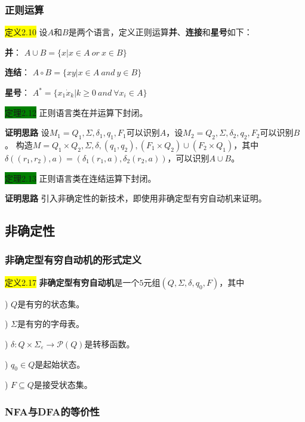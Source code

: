 \documentclass[a4paper]{article}
\begin{document}
\subsubsection{正则运算}

	\colorbox{yellow}{定义2.10} 设$A$和$B$是两个语言，定义正则运算\textbf{并}、\textbf{连接}和\textbf{星号}如下：
	
	\qquad \textbf{并}： $A \cup B = \{x|x \in A~or~x \in B\}$
	
	\qquad \textbf{连结}： $A \circ B = \{xy|x \in A~and~y \in B\}$
	
	\qquad \textbf{星号}： $A^* = \{x_1 \dot x_k|k \geq 0~and~\forall x_i \in A\}$

	\colorbox{green}{定理2.12} 正则语言类在并运算下封闭。
	
	\textbf{证明思路} 
	\qquad 设$M_1={Q_1,\Sigma,\delta_1,q_1,F_1}$可以识别$A$，设$M_2={Q_2,\Sigma,\delta_2,q_2,F_2}$可以识别$B$。
	\qquad 构造$M={Q_1 \times Q_2,\Sigma,\delta,(q_1, q_2),(F_1 \times Q_2) \cup (F_2 \times Q_1)}$，其中$\delta((r_1,r_2), a)=(\delta_1(r_1,a), \delta_2(r_2, a))$，可以识别$A \cup B$。
	
	\colorbox{green}{定理2.13} 正则语言类在连结运算下封闭。
	
	\textbf{证明思路} \quad 引入非确定性的新技术，即使用非确定型有穷自动机来证明。

\subsection{非确定性}

\subsubsection{非确定型有穷自动机的形式定义}

	\colorbox{yellow}{定义2.17} \textbf{非确定型有穷自动机}是一个$5$元组$(Q, \Sigma, \delta, q_0, F)$，其中
	
	) $Q$是有穷的状态集。
	
	) $\Sigma$是有穷的字母表。

	) $\delta:Q\times \Sigma_{\varepsilon} \rightarrow \mathcal{P}(Q)$是转移函数。
	
	) $q_0 \in Q$是起始状态。
	
	) $F \subseteq Q$是接受状态集。

\subsubsection{NFA与DFA的等价性}
\end{document}
